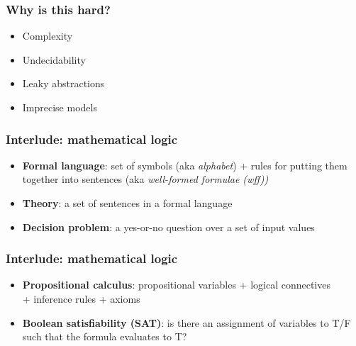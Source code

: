 \documentclass[11pt,table]{beamer}
\begin{document}
\begin{frame}
\frametitle{Why is this hard?}
\begin{itemize}
\item{Complexity}
  \medskip
\item{Undecidability}
  \medskip
\item{Leaky abstractions}
  \medskip
\item{Imprecise models}
\end{itemize}
\end{frame}
  
  
\begin{frame}
  \frametitle{Interlude: mathematical logic}
  \begin{itemize}
  \item{\textbf{Formal language}: set of symbols (aka \textit{alphabet}) + rules for putting them together into sentences (aka \textit{well-formed formulae (wff))}}
    \medskip
  \item{\textbf{Theory}: a set of sentences in a formal language}
    \medskip
  \item{\textbf{Decision problem}: a yes-or-no question over a set of input values}
\end{itemize}
\end{frame}

\begin{frame}
  \frametitle{Interlude: mathematical logic}
  \begin{itemize}
  \item{\textbf{Propositional calculus}: propositional variables + logical connectives \\
    + inference rules + axioms}
    \medskip
  \item{\textbf{Boolean satisfiability (SAT)}: is there an assignment of variables to T/F such that the formula evaluates to T?}
  \end{itemize}
\end{frame}
\end{document}
